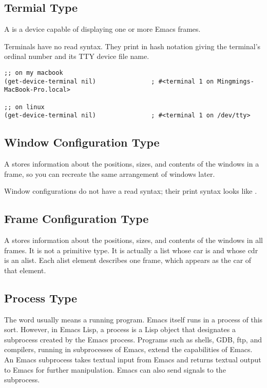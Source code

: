 \subsection{Termial Type}
\label{sec:termial-type}

A  is a device capable of displaying one or more Emacs frames.

Terminals have no read syntax.
They print in hash notation giving the terminal’s ordinal number and its TTY device file name.
\begin{lstlisting}
;; on my macbook
(get-device-terminal nil)               ; #<terminal 1 on Mingmings-MacBook-Pro.local>

;; on linux
(get-device-terminal nil)               ; #<terminal 1 on /dev/tty>
\end{lstlisting}

\subsection{Window Configuration Type}
\label{sec:wind-conf-type}

A  stores information about the positions, sizes, and contents of the windows in a frame, so you can recreate the same arrangement of windows later.

Window configurations do not have a read syntax; their print syntax looks like .


\subsection{Frame Configuration Type}
\label{sec:frame-conf-type}

A  stores information about the positions, sizes, and contents of the windows in all frames.
It is not a primitive type.
It is actually a list whose car is  and whose cdr is an alist.
Each alist element describes one frame, which appears as the car of that element.


\subsection{Process Type}
\label{sec:process-type}

The word  usually means a running program.
Emacs itself runs in a process of this sort.
However, in Emacs Lisp, a process is a Lisp object that designates a subprocess created by the Emacs process.
Programs such as shells, GDB, ftp, and compilers, running in subprocesses of Emacs, extend the capabilities of Emacs.
An Emacs subprocess takes textual input from Emacs and returns textual output to Emacs for further manipulation.
Emacs can also send signals to the subprocess.


